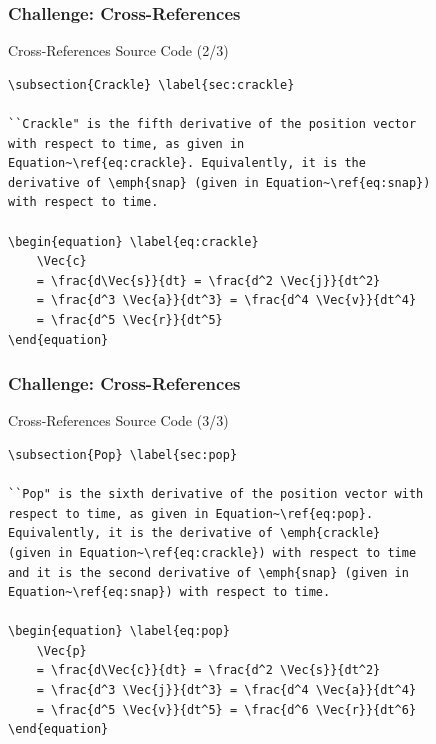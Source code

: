 \begin{frame}[fragile]
\frametitle{Challenge: Cross-References}
\begin{alertblock}{Cross-References Source Code (2/3)}
\small
\begin{verbatim}
\subsection{Crackle} \label{sec:crackle}

``Crackle" is the fifth derivative of the position vector 
with respect to time, as given in 
Equation~\ref{eq:crackle}. Equivalently, it is the 
derivative of \emph{snap} (given in Equation~\ref{eq:snap}) 
with respect to time.

\begin{equation} \label{eq:crackle}
    \Vec{c} 
    = \frac{d\Vec{s}}{dt} = \frac{d^2 \Vec{j}}{dt^2} 
    = \frac{d^3 \Vec{a}}{dt^3} = \frac{d^4 \Vec{v}}{dt^4} 
    = \frac{d^5 \Vec{r}}{dt^5}
\end{equation}
\end{verbatim}
\end{alertblock} 
\end{frame}


\begin{frame}[fragile]
\frametitle{Challenge: Cross-References}
\begin{alertblock}{Cross-References Source Code (3/3)}
\small
\begin{verbatim}
\subsection{Pop} \label{sec:pop}

``Pop" is the sixth derivative of the position vector with
respect to time, as given in Equation~\ref{eq:pop}. 
Equivalently, it is the derivative of \emph{crackle} 
(given in Equation~\ref{eq:crackle}) with respect to time 
and it is the second derivative of \emph{snap} (given in 
Equation~\ref{eq:snap}) with respect to time. 

\begin{equation} \label{eq:pop}
    \Vec{p} 
    = \frac{d\Vec{c}}{dt} = \frac{d^2 \Vec{s}}{dt^2} 
    = \frac{d^3 \Vec{j}}{dt^3} = \frac{d^4 \Vec{a}}{dt^4} 
    = \frac{d^5 \Vec{v}}{dt^5} = \frac{d^6 \Vec{r}}{dt^6}
\end{equation}
\end{verbatim}
\end{alertblock} 
\end{frame}